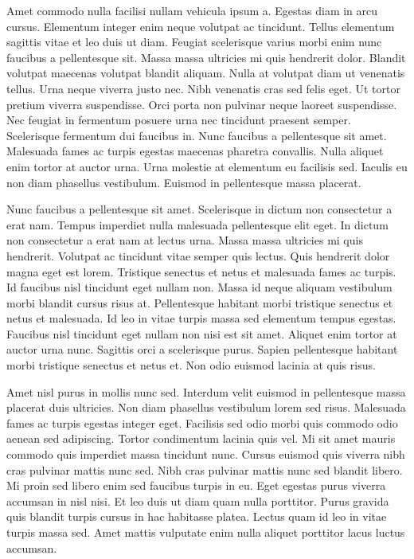 \documentclass[conference]{IEEEtran}
\begin{document}
Amet commodo nulla facilisi nullam vehicula ipsum a. Egestas diam in arcu cursus. Elementum integer enim neque volutpat ac tincidunt. Tellus elementum sagittis vitae et leo duis ut diam. Feugiat scelerisque varius morbi enim nunc faucibus a pellentesque sit. Massa massa ultricies mi quis hendrerit dolor. Blandit volutpat maecenas volutpat blandit aliquam. Nulla at volutpat diam ut venenatis tellus. Urna neque viverra justo nec. Nibh venenatis cras sed felis eget. Ut tortor pretium viverra suspendisse. Orci porta non pulvinar neque laoreet suspendisse. Nec feugiat in fermentum posuere urna nec tincidunt praesent semper. Scelerisque fermentum dui faucibus in. Nunc faucibus a pellentesque sit amet. Malesuada fames ac turpis egestas maecenas pharetra convallis. Nulla aliquet enim tortor at auctor urna. Urna molestie at elementum eu facilisis sed. Iaculis eu non diam phasellus vestibulum. Euismod in pellentesque massa placerat.

Nunc faucibus a pellentesque sit amet. Scelerisque in dictum non consectetur a erat nam. Tempus imperdiet nulla malesuada pellentesque elit eget. In dictum non consectetur a erat nam at lectus urna. Massa massa ultricies mi quis hendrerit. Volutpat ac tincidunt vitae semper quis lectus. Quis hendrerit dolor magna eget est lorem. Tristique senectus et netus et malesuada fames ac turpis. Id faucibus nisl tincidunt eget nullam non. Massa id neque aliquam vestibulum morbi blandit cursus risus at. Pellentesque habitant morbi tristique senectus et netus et malesuada. Id leo in vitae turpis massa sed elementum tempus egestas. Faucibus nisl tincidunt eget nullam non nisi est sit amet. Aliquet enim tortor at auctor urna nunc. Sagittis orci a scelerisque purus. Sapien pellentesque habitant morbi tristique senectus et netus et. Non odio euismod lacinia at quis risus.

Amet nisl purus in mollis nunc sed. Interdum velit euismod in pellentesque massa placerat duis ultricies. Non diam phasellus vestibulum lorem sed risus. Malesuada fames ac turpis egestas integer eget. Facilisis sed odio morbi quis commodo odio aenean sed adipiscing. Tortor condimentum lacinia quis vel. Mi sit amet mauris commodo quis imperdiet massa tincidunt nunc. Cursus euismod quis viverra nibh cras pulvinar mattis nunc sed. Nibh cras pulvinar mattis nunc sed blandit libero. Mi proin sed libero enim sed faucibus turpis in eu. Eget egestas purus viverra accumsan in nisl nisi. Et leo duis ut diam quam nulla porttitor. Purus gravida quis blandit turpis cursus in hac habitasse platea. Lectus quam id leo in vitae turpis massa sed. Amet mattis vulputate enim nulla aliquet porttitor lacus luctus accumsan.
\end{document}
